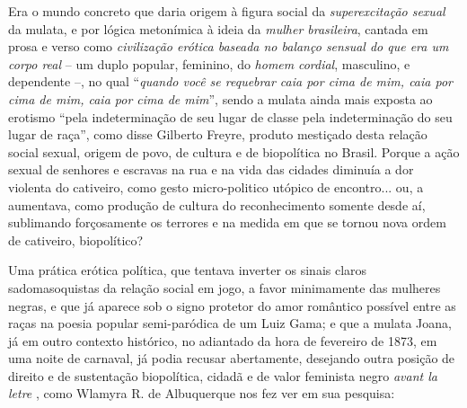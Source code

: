 Era o mundo concreto que daria origem à figura social da
\emph{superexcitação sexual} da mulata, e por lógica metonímica à ideia
da \emph{mulher brasileira}, cantada em prosa e verso como
\emph{civilização erótica baseada no balanço sensual do que era um corpo
real} -- um duplo popular, feminino, do \emph{homem} \emph{cordial},
masculino, e dependente --, no qual ``\emph{quando você se requebrar
caia por cima de mim, caia por cima de mim, caia por cima de mim}'',
sendo a mulata ainda mais exposta ao erotismo ``pela indeterminação de
seu lugar de classe pela indeterminação do seu lugar de raça'', como
disse Gilberto Freyre, produto mestiçado desta relação social sexual,
origem de povo, de cultura e de biopolítica no Brasil. Porque a ação
sexual de senhores e escravas na rua e na vida das cidades diminuía a
dor violenta do cativeiro, como gesto micro-politico utópico de
encontro... ou, a aumentava, como produção de cultura do reconhecimento
somente desde aí, sublimando forçosamente os terrores e na medida em que
se tornou nova ordem de cativeiro, biopolítico?

Uma prática erótica política, que tentava inverter os sinais claros
sadomasoquistas da relação social em jogo, a favor minimamente das
mulheres negras, e que já aparece sob o signo protetor do amor romântico
possível entre as raças na poesia popular semi-paródica de um Luiz Gama;
e que a mulata Joana, já em outro contexto histórico, no adiantado da
hora de fevereiro de 1873, em uma noite de carnaval, já podia recusar
abertamente, desejando outra posição de direito e de sustentação
biopolítica, cidadã e de valor feminista negro \emph{avant la letre} ,
como Wlamyra R. de Albuquerque nos fez ver em sua pesquisa:

